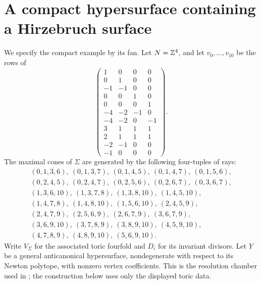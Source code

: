 \section{A compact hypersurface containing a Hirzebruch surface}\label{sec:geometry}

We specify the compact example by its fan. Let $N=\mathbb Z^4$, and let
$v_0,\ldots,v_{10}$ be the rows of
\begin{equation}\label{eq:rays}
 \begin{pmatrix}
 1&0&0&0\\0&1&0&0\\-1&-1&0&0\\0&0&1&0\\0&0&0&1\\
 -4&-2&-1&0\\-4&-2&0&-1\\3&1&1&1\\2&1&1&1\\
 -2&-1&0&0\\-1&0&0&0
 \end{pmatrix}.
\end{equation}
The maximal cones of $\Sigma$ are generated by the following
four-tuples of rays:
\begin{equation}\label{eq:cones}
\begin{gathered}
 (0,1,3,6),\ (0,1,3,7),\ (0,1,4,5),\ (0,1,4,7),\ (0,1,5,6),\\
 (0,2,4,5),\ (0,2,4,7),\ (0,2,5,6),\ (0,2,6,7),\ (0,3,6,7),\\
 (1,3,6,10),\ (1,3,7,8),\ (1,3,8,10),\ (1,4,5,10),\\
 (1,4,7,8),\ (1,4,8,10),\ (1,5,6,10),\ (2,4,5,9),\\
 (2,4,7,9),\ (2,5,6,9),\ (2,6,7,9),\ (3,6,7,9),\\
 (3,6,9,10),\ (3,7,8,9),\ (3,8,9,10),\ (4,5,9,10),\\
 (4,7,8,9),\ (4,8,9,10),\ (5,6,9,10).
\end{gathered}
\end{equation}
Write $V_\Sigma$ for the associated toric fourfold and $D_i$ for
its invariant divisors. Let $Y$ be a general anticanonical
hypersurface, nondegenerate with respect to its Newton polytope,
with nonzero vertex coefficients. This is the resolution chamber
used in \cite{Higgs,Transition}; the construction below uses only
the displayed toric data.

